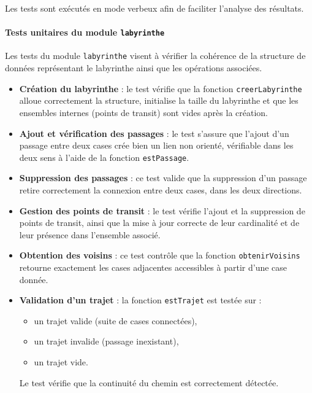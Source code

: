 Les tests sont exécutés en mode verbeux afin de faciliter l’analyse des résultats.



\paragraph{Tests unitaires du module \texttt{labyrinthe}}

Les tests du module \texttt{labyrinthe} visent à vérifier la cohérence de la structure
de données représentant le labyrinthe ainsi que les opérations associées.

\begin{itemize}
    \item \textbf{Création du labyrinthe} :  
    le test vérifie que la fonction \texttt{creerLabyrinthe} alloue correctement la structure,
    initialise la taille du labyrinthe et que les ensembles internes (points de transit)
    sont vides après la création.

    \item \textbf{Ajout et vérification des passages} :  
    le test s’assure que l’ajout d’un passage entre deux cases crée bien un lien non orienté,
    vérifiable dans les deux sens à l’aide de la fonction \texttt{estPassage}.

    \item \textbf{Suppression des passages} :  
    ce test valide que la suppression d’un passage retire correctement la connexion
    entre deux cases, dans les deux directions.

    \item \textbf{Gestion des points de transit} :  
    le test vérifie l’ajout et la suppression de points de transit, ainsi que la mise à jour
    correcte de leur cardinalité et de leur présence dans l’ensemble associé.

    \item \textbf{Obtention des voisins} :  
    ce test contrôle que la fonction \texttt{obtenirVoisins} retourne exactement
    les cases adjacentes accessibles à partir d’une case donnée.

    \item \textbf{Validation d’un trajet} :  
    la fonction \texttt{estTrajet} est testée sur :
    \begin{itemize}
        \item un trajet valide (suite de cases connectées),
        \item un trajet invalide (passage inexistant),
        \item un trajet vide.
    \end{itemize}
    Le test vérifie que la continuité du chemin est correctement détectée.
\end{itemize}



